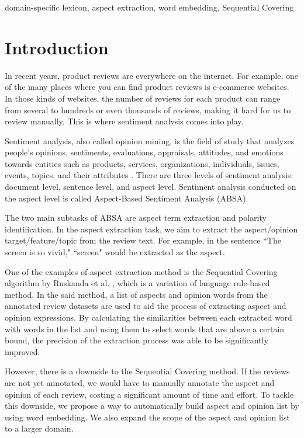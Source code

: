 \documentclass[a4paper,conference]{IEEEtran}
\begin{document}
\begin{IEEEkeywords}
domain-specific lexicon, aspect extraction, word embedding, Sequential Covering
\end{IEEEkeywords}

\section{Introduction}
In recent years, product reviews are everywhere on the internet. For example, one of the many places where you can find product reviews is e-commerce websites. In those kinds of websites, the number of reviews for each product can range from several to hundreds or even thousands of reviews, making it hard for us to review manually. This is where sentiment analysis comes into play.

Sentiment analysis, also called opinion mining, is the field of study that analyzes people’s opinions, sentiments, evaluations, appraisals, attitudes, and emotions towards entities such as products, services, organizations, individuals, issues, events, topics, and their attributes \cite{b1}. There are three levels of sentiment analysis: document level, sentence level, and aspect level. Sentiment analysis conducted on the aspect level is called Aspect-Based Sentiment Analysis (ABSA).

The two main subtasks of ABSA are aspect term extraction and polarity identification. In the aspect extraction task, we aim to extract the aspect/opinion target/feature/topic from the review text. For example, in the sentence ``The screen is so vivid," ``screen" would be extracted as the aspect. 

One of the examples of aspect extraction method is the Sequential Covering algorithm by Ruskanda et al. \cite{b2}, which is a variation of language rule-based method. In the said method, a list of aspects and opinion words from the annotated review datasets are used to aid the process of extracting aspect and opinion expressions. By calculating the similarities between each extracted word with words in the list and using them to select words that are above a certain bound, the precision of the extraction process was able to be significantly improved.

However, there is a downside to the Sequential Covering method.  If the reviews are not yet annotated, we would have to manually annotate the aspect and opinion of each review, costing a significant amount of time and effort. To tackle this downside, we propose a way to automatically build aspect and opinion list by using word embedding. We also expand the scope of the aspect and opinion list to a larger domain.
\end{document}
